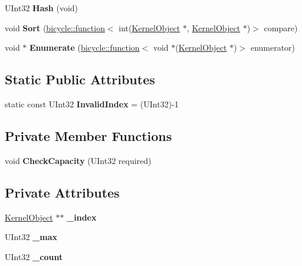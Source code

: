 \begin{DoxyCompactItemize}
\item 
\mbox{\label{class_kernel_array_addd9def6a7c418ad266e6bcb9f04ad2b}} 
U\+Int32 {\bfseries Hash} (void)
\item 
\mbox{\label{class_kernel_array_ad843363091e9a9c78ea335b1f6e7f665}} 
void {\bfseries Sort} (\hyperlink{classbicycle_1_1function}{bicycle\+::function}$<$ int(\hyperlink{class_kernel_object}{Kernel\+Object} $\ast$, \hyperlink{class_kernel_object}{Kernel\+Object} $\ast$)$>$ compare)
\item 
\mbox{\label{class_kernel_array_a0aa81ce91d139b13e5096ca34156870d}} 
void $\ast$ {\bfseries Enumerate} (\hyperlink{classbicycle_1_1function}{bicycle\+::function}$<$ void $\ast$(\hyperlink{class_kernel_object}{Kernel\+Object} $\ast$)$>$ enumerator)
\end{DoxyCompactItemize}
\subsection*{Static Public Attributes}
\begin{DoxyCompactItemize}
\item 
\mbox{\label{class_kernel_array_a14cfe2588c8c1ff9bac63811d5c75622}} 
static const U\+Int32 {\bfseries Invalid\+Index} = (U\+Int32)-\/1
\end{DoxyCompactItemize}
\subsection*{Private Member Functions}
\begin{DoxyCompactItemize}
\item 
\mbox{\label{class_kernel_array_a1b682e9ee1cea994e453e91805277911}} 
void {\bfseries Check\+Capacity} (U\+Int32 required)
\end{DoxyCompactItemize}
\subsection*{Private Attributes}
\begin{DoxyCompactItemize}
\item 
\mbox{\label{class_kernel_array_a732dbd77aa85db228732d567af33b1f1}} 
\hyperlink{class_kernel_object}{Kernel\+Object} $\ast$$\ast$ {\bfseries \+\_\+index}
\item 
\mbox{\label{class_kernel_array_aaf982d91a2555f1b9f6724d4b6dbb191}} 
U\+Int32 {\bfseries \+\_\+max}
\item 
\mbox{\label{class_kernel_array_adef73cb91ffbc5a03c6e46a704bb1d99}} 
U\+Int32 {\bfseries \+\_\+count}
\end{DoxyCompactItemize}
